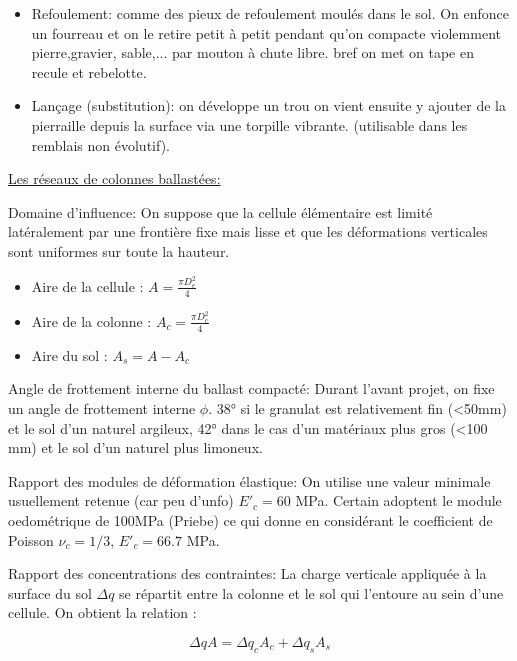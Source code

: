 \begin{itemize}
    \item Refoulement: comme des pieux de refoulement moulés dans le sol. On enfonce un fourreau et on le retire petit à petit pendant qu'on compacte violemment pierre,gravier, sable,... par mouton à chute libre. bref on met on tape en recule et rebelotte.
    \item Lançage (substitution): on développe un trou on vient ensuite y ajouter de la pierraille depuis la surface via une torpille vibrante. (utilisable dans les remblais non évolutif).
\end{itemize}

\medskip

\underline{Les réseaux de colonnes ballastées:}

Domaine d'influence: On suppose que la cellule élémentaire est limité latéralement par une frontière fixe mais lisse et que les déformations verticales sont uniformes sur toute la hauteur.

\begin{itemize}
    \item Aire de la cellule : $A = \frac{\pi D_e^2}{4}$
    \item Aire de la colonne : $A_c = \frac{\pi D_c^2}{4}$
    \item Aire du sol : $A_s = A - A_c$
\end{itemize}

\medskip

Angle de frottement interne du ballast compacté: Durant l'avant projet, on fixe un angle de frottement interne $\phi$. 38° si le granulat est relativement fin (<50mm) et le sol d'un naturel argileux, 42° dans le cas d'un matériaux plus gros (<100 mm) et le sol d'un naturel plus limoneux.

\medskip

Rapport des modules de déformation élastique: On utilise une valeur minimale usuellement retenue (car peu d'unfo) $E'_c = 60$ MPa. Certain adoptent le module oedométrique de 100MPa (Priebe) ce qui donne en considérant le coefficient de Poisson $\nu_c = 1/3$, $E'_c=66.7$ MPa.

\medskip 

Rapport des concentrations des contraintes: La charge verticale appliquée à la surface du sol $\Delta q$ se répartit entre la colonne et le sol qui l'entoure au sein d'une cellule. On obtient la relation :

$$ \Delta q A=\Delta q_c A_c + \Delta q_s A_s $$ 

